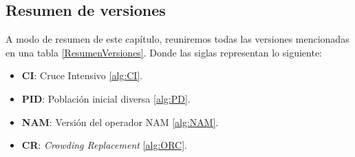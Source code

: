 \subsection{Resumen de versiones}

A modo de resumen de este capítulo, reuniremos todas las versiones mencionadas en una tabla \ref{ResumenVersiones}. 
Donde las siglas representan lo siguiente:
\begin{itemize}
	\item \textbf{CI}: Cruce Intensivo \ref{alg:CI}.
	\item \textbf{PID}: Población inicial diversa \ref{alg:PD}.
	\item \textbf{NAM}: Versión del operador NAM \ref{alg:NAM}.
	\item \textbf{CR}: \textit{Crowding Replacement} \ref{alg:ORC}.
\end{itemize}

